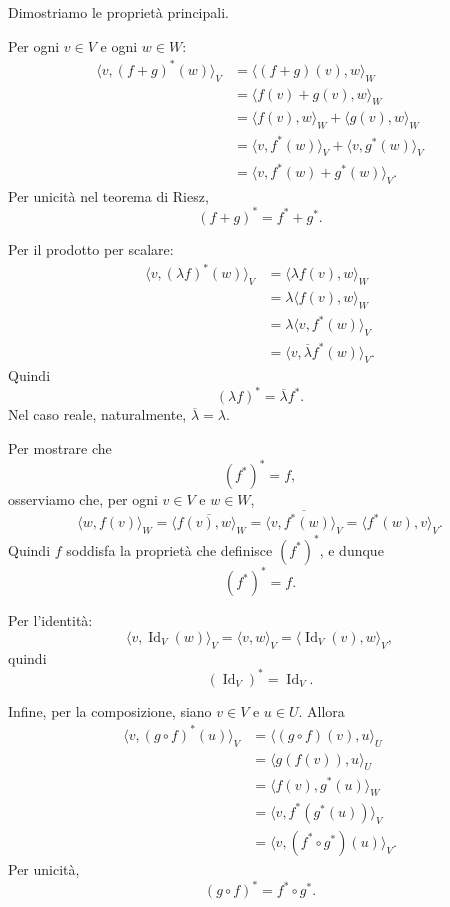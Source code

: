 \documentclass[a4paper]{article}
\begin{document}
\begin{snippetproof}{}
    Dimostriamo le proprietà principali.

    Per ogni \(v\in V\) e ogni \(w\in W\):
    \begin{align*}
        \langle v,(f+g)^*(w)\rangle_V
        &=
        \langle (f+g)(v),w\rangle_W\\
        &=
        \langle f(v)+g(v),w\rangle_W\\
        &=
        \langle f(v),w\rangle_W+\langle g(v),w\rangle_W\\
        &=
        \langle v,f^*(w)\rangle_V+\langle v,g^*(w)\rangle_V\\
        &=
        \langle v,f^*(w)+g^*(w)\rangle_V.
    \end{align*}
    Per unicità nel teorema di Riesz,
    \[
        (f+g)^*=f^*+g^*.
    \]

    Per il prodotto per scalare:
    \begin{align*}
        \langle v,(\lambda f)^*(w)\rangle_V
        &=
        \langle \lambda f(v),w\rangle_W\\
        &=
        \lambda\langle f(v),w\rangle_W\\
        &=
        \lambda\langle v,f^*(w)\rangle_V\\
        &=
        \langle v,\overline{\lambda}f^*(w)\rangle_V.
    \end{align*}
    Quindi
    \[
        (\lambda f)^*=\overline{\lambda}f^*.
    \]
    Nel caso reale, naturalmente, \(\overline{\lambda}=\lambda\).

    Per mostrare che
    \[
        (f^*)^*=f,
    \]
    osserviamo che, per ogni \(v\in V\) e \(w\in W\),
    \[
        \langle w,f(v)\rangle_W
        =
        \overline{\langle f(v),w\rangle_W}
        =
        \overline{\langle v,f^*(w)\rangle_V}
        =
        \langle f^*(w),v\rangle_V.
    \]
    Quindi \(f\) soddisfa la proprietà che definisce \((f^*)^*\), e dunque
    \[
        (f^*)^*=f.
    \]

    Per l'identità:
    \[
        \langle v,\operatorname{Id}_V(w)\rangle_V
        =
        \langle v,w\rangle_V
        =
        \langle \operatorname{Id}_V(v),w\rangle_V,
    \]
    quindi
    \[
        (\operatorname{Id}_V)^*=\operatorname{Id}_V.
    \]

    Infine, per la composizione, siano \(v\in V\) e \(u\in U\). Allora
    \begin{align*}
        \langle v,(g\circ f)^*(u)\rangle_V
        &=
        \langle (g\circ f)(v),u\rangle_U\\
        &=
        \langle g(f(v)),u\rangle_U\\
        &=
        \langle f(v),g^*(u)\rangle_W\\
        &=
        \langle v,f^*(g^*(u))\rangle_V\\
        &=
        \langle v,(f^*\circ g^*)(u)\rangle_V.
    \end{align*}
    Per unicità,
    \[
        (g\circ f)^*=f^*\circ g^*.
    \]
\end{snippetproof}
\end{document}
